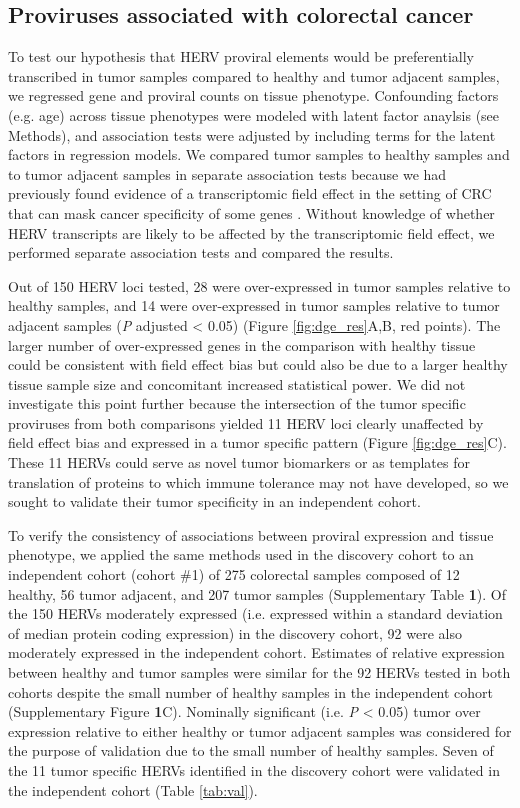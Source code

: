 \subsection*{Proviruses associated with colorectal cancer}
To test our hypothesis that HERV proviral elements would be preferentially transcribed in tumor samples compared to healthy and tumor adjacent samples, we regressed gene and proviral counts on tissue phenotype.
Confounding factors (e.g. age) across tissue phenotypes were modeled with latent factor anaylsis (see Methods), and association tests were adjusted by including terms for the latent factors in regression models.
We compared tumor samples to healthy samples and to tumor adjacent samples in separate association tests because we had previously found evidence of a transcriptomic field effect in the setting of CRC that can mask cancer specificity of some genes \citep{Dampier2020}.
Without knowledge of whether HERV transcripts are likely to be affected by the transcriptomic field effect, we performed separate association tests and compared the results.

Out of 150 HERV loci tested, 28 were over-expressed in tumor samples relative to healthy samples, and 14 were over-expressed in tumor samples relative to tumor adjacent samples (\emph{P} adjusted < 0.05) (Figure \ref{fig:dge_res}A,B, red points).
The larger number of over-expressed genes in the comparison with healthy tissue could be consistent with field effect bias but could also be due to a larger healthy tissue sample size and concomitant increased statistical power.
We did not investigate this point further because the intersection of the tumor specific proviruses from both comparisons yielded 11 HERV loci clearly unaffected by field effect bias and expressed in a tumor specific pattern (Figure \ref{fig:dge_res}C).
These 11 HERVs could serve as novel tumor biomarkers or as templates for translation of proteins to which immune tolerance may not have developed, so we sought to validate their tumor specificity in an independent cohort.

To verify the consistency of associations between proviral expression and tissue phenotype, we applied the same methods used in the discovery cohort to an independent cohort (cohort \#1) of 275 colorectal samples composed of 12 healthy, 56 tumor adjacent, and 207 tumor samples (Supplementary Table \textbf{1}).
Of the 150 HERVs moderately expressed (i.e. expressed within a standard deviation of median protein coding expression) in the discovery cohort, 92 were also moderately expressed in the independent cohort.
Estimates of relative expression between healthy and tumor samples were similar for the 92 HERVs tested in both cohorts despite the small number of healthy samples in the independent cohort (Supplementary Figure \textbf{1}C).
Nominally significant (i.e. \emph{P} < 0.05) tumor over expression relative to either healthy or tumor adjacent samples was considered for the purpose of validation due to the small number of healthy samples.
Seven of the 11 tumor specific HERVs identified in the discovery cohort were validated in the independent cohort (Table \ref{tab:val}).


